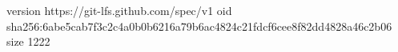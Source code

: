 version https://git-lfs.github.com/spec/v1
oid sha256:6abe5cab7f3c2c4a0b0b6216a79b6ac4824c21fdcf6cee8f82dd4828a46c2b06
size 1222
